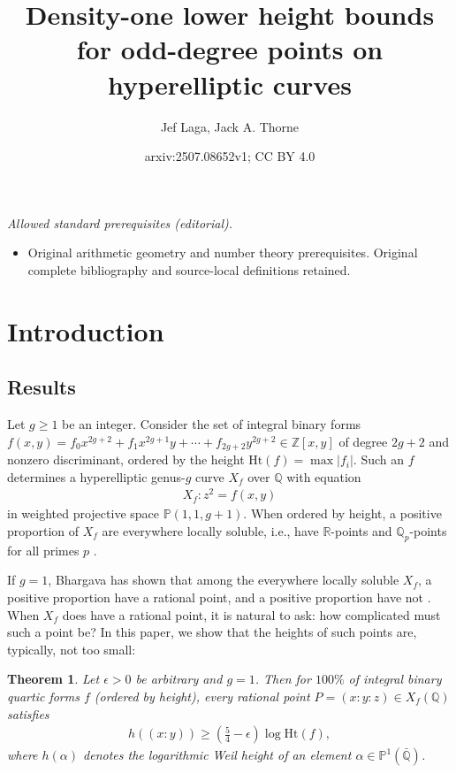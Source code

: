 \documentclass{article} %
\title{Density-one lower height bounds for odd-degree points on hyperelliptic curves}
\author{Jef Laga, Jack A. Thorne}
\date{arxiv:2507.08652v1; CC BY 4.0}
\newtheorem{theorem}[proposition]{Theorem}
\numberwithin{equation}{section}
\renewcommand{\P}{\mathbb{P}}
\newcommand{\R}{\mathbb{R}}
\newcommand{\Q}{\mathbb{Q}}
\newcommand{\Z}{\mathbb{Z}}
\newcommand{\height}{\mathrm{Ht}}
\begin{document}
\maketitle
\noindent\textit{Allowed standard prerequisites (editorial).}\begin{itemize}
\item Original arithmetic geometry and number theory prerequisites. Original complete bibliography and source-local definitions retained.
\end{itemize}\medskip
\section{Introduction}



\subsection{Results}
Let $g\geq 1$ be an integer.
Consider the set of integral binary forms $f(x,y) = f_0x^{2g+2}  +f_1 x^{2g+1}y + \cdots + f_{2g+2} y^{2g+2} \in \Z[x,y]$ of degree $2g+2$ and nonzero discriminant, ordered by the height $\height(f) = \max |f_i|$. 
Such an $f$ determines a hyperelliptic genus-$g$ curve $X_f$ over $\Q$ with equation 
\begin{align}\label{eq_introhyperellipticcurve}
    X_f \colon z^2 = f(x,y) 
\end{align}
in weighted projective space $\P(1,1,g+1)$.
When ordered by height, a positive proportion of $X_f$ are everywhere locally soluble, i.e., have $\R$-points and $\Q_p$-points for all primes $p$ \cite{PoonenStoll-localglobaldensities}.

If $g=1$, Bhargava has shown that among the everywhere locally soluble $X_f$, a positive proportion have a rational point, and a positive proportion have not \cite{Bhargava-hasseprincipleplanecubics}.
When $X_f$ does have a rational point, it is natural to ask: how complicated must such a point be?
In this paper, we show that the heights of such points are, typically, not too small: 
\begin{theorem}\label{theorem_intro1}
    Let $\epsilon>0$ be arbitrary and $g=1$.
    Then for $100\%$ of integral binary quartic forms $f$ (ordered by height), every rational point $P = (x:y:z)\in X_f(\Q)$ satisfies 
    \begin{align}
        h((x:y)) \geq \left(\frac{5}{4}- \epsilon\right) \log \height(f),
    \end{align}
    where $h(\alpha)$ denotes the logarithmic Weil height of an element $\alpha \in \P^1(\bar{\Q})$.
\end{theorem}
\end{document}
